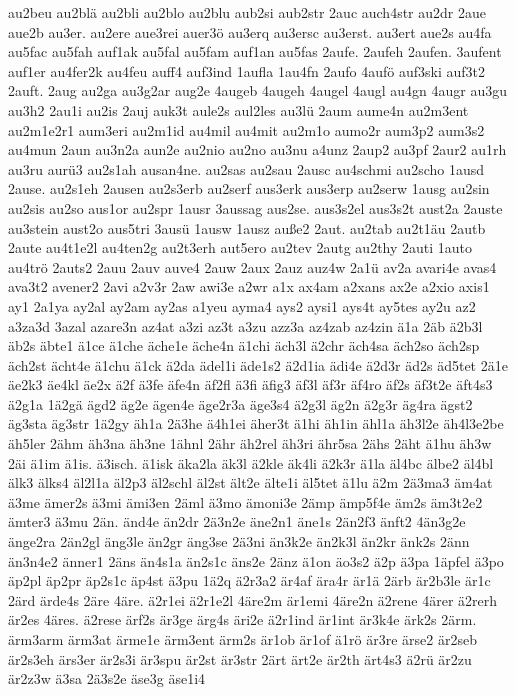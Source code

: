 {au2beu
au2blä
au2bli
au2blo
au2blu
aub2si
aub2str
2auc
auch4str
au2dr
2aue
aue2b
au3er.
au2ere
aue3rei
auer3ö
au3erq
au3ersc
au3erst.
au3ert
aue2s
au4fa
au5fac
au5fah
auf1ak
au5fal
au5fam
auf1an
au5fas
2aufe.
2aufeh
2aufen.
3aufent
auf1er
au4fer2k
au4feu
auff4
auf3ind
1aufla
1au4fn
2aufo
4aufö
auf3ski
auf3t2
2auft.
2aug
au2ga
au3g2ar
aug2e
4augeb
4augeh
4augel
4augl
au4gn
4augr
au3gu
au3h2
2au1i
au2is
2auj
auk3t
aule2s
aul2les
au3lü
2aum
aume4n
au2m3ent
au2m1e2r1
aum3eri
au2m1id
au4mil
au4mit
au2m1o
aumo2r
aum3p2
aum3s2
au4mun
2aun
au3n2a
aun2e
au2nio
au2no
au3nu
a4unz
2aup2
au3pf
2aur2
au1rh
au3ru
aurü3
au2s1ah
ausan4ne.
au2sas
au2sau
2ausc
au4schmi
au2scho
1ausd
2ause.
au2s1eh
2ausen
au2s3erb
au2serf
aus3erk
aus3erp
au2serw
1ausg
au2sin
au2sis
au2so
aus1or
au2spr
1ausr
3aussag
aus2se.
aus3s2el
aus3s2t
aust2a
2auste
au3stein
aust2o
aus5tri
3ausü
1ausw
1ausz
auße2
2aut.
au2tab
au2t1äu
2autb
2aute
au4t1e2l
au4ten2g
au2t3erh
aut5ero
au2tev
2autg
au2thy
2auti
1auto
au4trö
2auts2
2auu
2auv
auve4
2auw
2aux
2auz
auz4w
2a1ü
av2a
avari4e
avas4
ava3t2
avener2
2avi
a2v3r
2aw
awi3e
a2wr
a1x
ax4am
a2xans
ax2e
a2xio
axis1
ay1
2a1ya
ay2al
ay2am
ay2as
a1yeu
ayma4
ays2
aysi1
ays4t
ay5tes
ay2u
az2
a3za3d
3azal
azare3n
az4at
a3zi
az3t
a3zu
azz3a
az4zab
az4zin
ä1a
2äb
ä2b3l
äb2s
äbte1
ä1ce
ä1che
äche1e
äche4n
ä1chi
äch3l
ä2chr
äch4sa
äch2so
äch2sp
äch2st
ächt4e
ä1chu
ä1ck
ä2da
ädel1i
äde1s2
ä2d1ia
ädi4e
ä2d3r
äd2s
äd5tet
2ä1e
äe2k3
äe4kl
äe2x
ä2f
ä3fe
äfe4n
äf2fl
ä3fi
äfig3
äf3l
äf3r
äf4ro
äf2s
äf3t2e
äft4s3
ä2g1a
1ä2gä
ägd2
äg2e
ägen4e
äge2r3a
äge3s4
ä2g3l
äg2n
ä2g3r
äg4ra
ägst2
äg3sta
äg3str
1ä2gy
äh1a
2ä3he
ä4h1ei
äher3t
ä1hi
äh1in
ähl1a
äh3l2e
äh4l3e2be
äh5ler
2ähm
äh3na
äh3ne
1ähnl
2ähr
äh2rel
äh3ri
ähr5sa
2ähs
2äht
ä1hu
äh3w
2äi
ä1im
ä1is.
ä3isch.
ä1isk
äka2la
äk3l
ä2kle
äk4li
ä2k3r
ä1la
äl4bc
älbe2
äl4bl
älk3
älks4
äl2l1a
äl2p3
äl2schl
äl2st
ält2e
älte1i
äl5tet
ä1lu
ä2m
2ä3ma3
äm4at
ä3me
ämer2s
ä3mi
ämi3en
2äml
ä3mo
ämoni3e
2ämp
ämp5f4e
äm2s
äm3t2e2
ämter3
ä3mu
2än.
änd4e
än2dr
2ä3n2e
äne2n1
äne1s
2än2f3
änft2
4än3g2e
änge2ra
2än2gl
äng3le
än2gr
äng3se
2ä3ni
än3k2e
än2k3l
än2kr
änk2s
2änn
än3n4e2
änner1
2äns
än4s1a
än2s1c
äns2e
2änz
ä1on
äo3s2
ä2p
ä3pa
1äpfel
ä3po
äp2pl
äp2pr
äp2s1c
äp4st
ä3pu
1ä2q
ä2r3a2
är4af
ära4r
är1ä
2ärb
är2b3le
är1c
2ärd
ärde4s
2äre
4äre.
ä2r1ei
ä2r1e2l
4äre2m
är1emi
4äre2n
ä2rene
4ärer
ä2rerh
är2es
4äres.
ä2rese
ärf2s
är3ge
ärg4s
äri2e
ä2r1ind
är1int
är3k4e
ärk2s
2ärm.
ärm3arm
ärm3at
ärme1e
ärm3ent
ärm2s
är1ob
är1of
ä1rö
är3re
ärse2
är2seb
är2s3eh
ärs3er
är2s3i
är3spu
är2st
är3str
2ärt
ärt2e
är2th
ärt4s3
ä2rü
är2zu
är2z3w
ä3sa
2ä3s2e
äse3g
äse1i4
}
